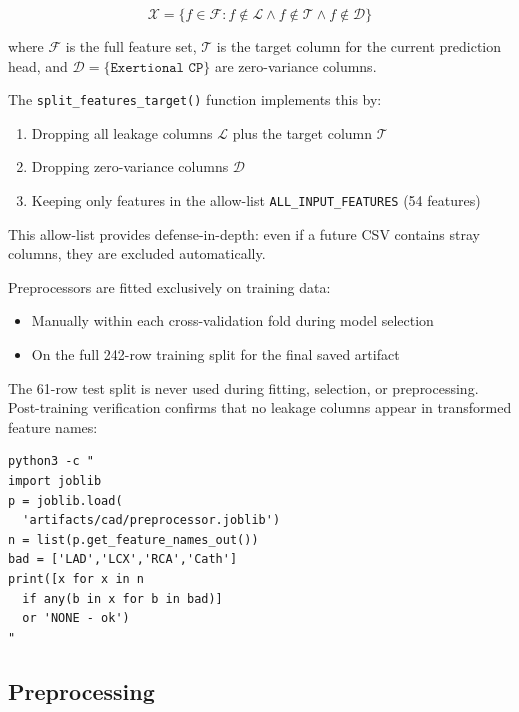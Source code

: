 \documentclass[conference]{IEEEtran}
\begin{document}
\begin{equation}
\mathcal{X} = \{f \in \mathcal{F} : f \notin \mathcal{L} \land f \notin \mathcal{T} \land f \notin \mathcal{D}\}
\end{equation}

where $\mathcal{F}$ is the full feature set, $\mathcal{T}$ is the target column for the current prediction head, and $\mathcal{D} = \{\texttt{Exertional CP}\}$ are zero-variance columns.

The \texttt{split\_features\_target()} function implements this by:
\begin{enumerate}
    \item Dropping all leakage columns $\mathcal{L}$ plus the target column $\mathcal{T}$
    \item Dropping zero-variance columns $\mathcal{D}$
    \item Keeping only features in the allow-list \texttt{ALL\_INPUT\_FEATURES} (54 features)
\end{enumerate}

This allow-list provides defense-in-depth: even if a future CSV contains stray columns, they are excluded automatically.

Preprocessors are fitted exclusively on training data:
\begin{itemize}
    \item Manually within each cross-validation fold during model selection
    \item On the full 242-row training split for the final saved artifact
\end{itemize}

The 61-row test split is never used during fitting, selection, or preprocessing. Post-training verification confirms that no leakage columns appear in transformed feature names:

\begin{footnotesize}
\begin{verbatim}
python3 -c "
import joblib
p = joblib.load(
  'artifacts/cad/preprocessor.joblib')
n = list(p.get_feature_names_out())
bad = ['LAD','LCX','RCA','Cath']
print([x for x in n
  if any(b in x for b in bad)]
  or 'NONE - ok')
"
\end{verbatim}
\end{footnotesize}

\subsection{Preprocessing}
\end{document}
